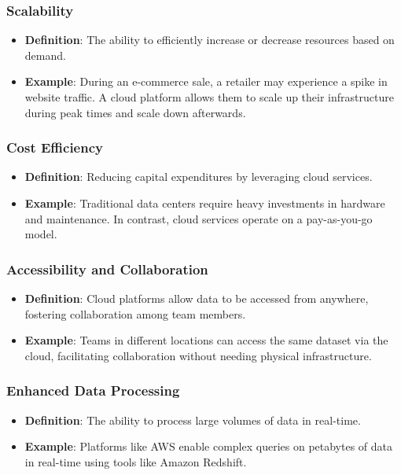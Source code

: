 \documentclass[aspectratio=169]{beamer}
\begin{document}
\begin{frame}[fragile]
  \frametitle{Scalability}
  \begin{itemize}
    \item \textbf{Definition}: The ability to efficiently increase or decrease resources based on demand.
    \item \textbf{Example}: During an e-commerce sale, a retailer may experience a spike in website traffic. A cloud platform allows them to scale up their infrastructure during peak times and scale down afterwards.
  \end{itemize}
\end{frame}

\begin{frame}[fragile]
  \frametitle{Cost Efficiency}
  \begin{itemize}
    \item \textbf{Definition}: Reducing capital expenditures by leveraging cloud services.
    \item \textbf{Example}: Traditional data centers require heavy investments in hardware and maintenance. In contrast, cloud services operate on a pay-as-you-go model.
  \end{itemize}
\end{frame}

\begin{frame}[fragile]
  \frametitle{Accessibility and Collaboration}
  \begin{itemize}
    \item \textbf{Definition}: Cloud platforms allow data to be accessed from anywhere, fostering collaboration among team members.
    \item \textbf{Example}: Teams in different locations can access the same dataset via the cloud, facilitating collaboration without needing physical infrastructure.
  \end{itemize}
\end{frame}

\begin{frame}[fragile]
  \frametitle{Enhanced Data Processing}
  \begin{itemize}
    \item \textbf{Definition}: The ability to process large volumes of data in real-time.
    \item \textbf{Example}: Platforms like AWS enable complex queries on petabytes of data in real-time using tools like Amazon Redshift.
  \end{itemize}
\end{frame}
\end{document}
